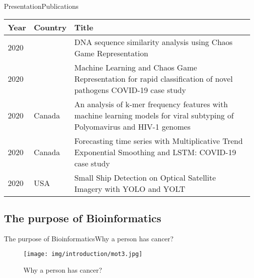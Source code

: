 \documentclass[10pt]{beamer}
\newcommand{\1}{
        	\setbeamertemplate{background}{
        		\texttt{[image: img/1]}
        		\tikz[overlay] \fill[fill opacity=0.75,fill=white] (0,0) rectangle (-\paperwidth,\paperheight);
        	}
}
\begin{document}
\begin{frame}{Presentation}{Publications}
	\begin{table}[]
		\setlength{\tabcolsep}{0.5em} %
		{\renewcommand{\arraystretch}{1.4}%
		\begin{tabular}{llp{8cm}}
			\textbf{Year} & \textbf{Country} & \textbf{Title}                                                                                                              \\
			\hline
			2020          &                  & DNA sequence similarity analysis using Chaos Game Representation                                                            \\
			2020          &                  & Machine Learning and Chaos Game Representation for rapid classification of novel pathogens COVID-19 case study              \\
			2020          & Canada           & An analysis of k-mer frequency features with machine learning models for viral subtyping of  Polyomavirus and HIV-1 genomes \\
			2020          & Canada           & Forecasting time series with Multiplicative Trend Exponential Smoothing and LSTM: COVID-19 case study                       \\
			2020          & USA              & Small Ship Detection on Optical Satellite Imagery with YOLO and YOLT                                                        \\
			                       
		\end{tabular}
	}
	\end{table}
\end{frame}

\subsection{The purpose of Bioinformatics}


\begin{frame}{The purpose of Bioinformatics}{Why a person has cancer?}
	\begin{figure}[]
		\centering
		\texttt{[image: img/introduction/mot3.jpg]}
		\label{img:mot2}
		\caption{Why a person has cancer?}
	\end{figure}
\end{frame}
\end{document}
